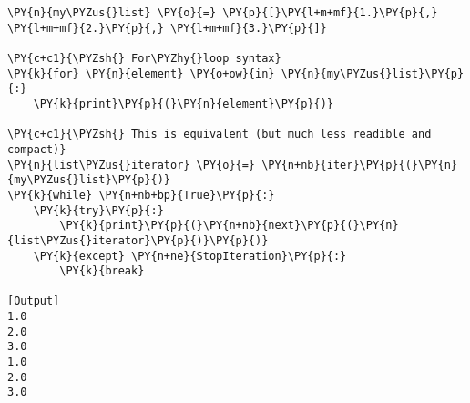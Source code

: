 \begin{Verbatim}[label=\makebox{\url{https://github.com/lucabaldini/cmepda/tree/master/slides/latex/snippets/show\_iterator.py}},commandchars=\\\{\}]
\PY{n}{my\PYZus{}list} \PY{o}{=} \PY{p}{[}\PY{l+m+mf}{1.}\PY{p}{,} \PY{l+m+mf}{2.}\PY{p}{,} \PY{l+m+mf}{3.}\PY{p}{]}

\PY{c+c1}{\PYZsh{} For\PYZhy{}loop syntax}
\PY{k}{for} \PY{n}{element} \PY{o+ow}{in} \PY{n}{my\PYZus{}list}\PY{p}{:}
    \PY{k}{print}\PY{p}{(}\PY{n}{element}\PY{p}{)}

\PY{c+c1}{\PYZsh{} This is equivalent (but much less readible and compact)}
\PY{n}{list\PYZus{}iterator} \PY{o}{=} \PY{n+nb}{iter}\PY{p}{(}\PY{n}{my\PYZus{}list}\PY{p}{)}
\PY{k}{while} \PY{n+nb+bp}{True}\PY{p}{:}
    \PY{k}{try}\PY{p}{:}
        \PY{k}{print}\PY{p}{(}\PY{n+nb}{next}\PY{p}{(}\PY{n}{list\PYZus{}iterator}\PY{p}{)}\PY{p}{)}
    \PY{k}{except} \PY{n+ne}{StopIteration}\PY{p}{:}
        \PY{k}{break}

[Output]
1.0
2.0
3.0
1.0
2.0
3.0
\end{Verbatim}
